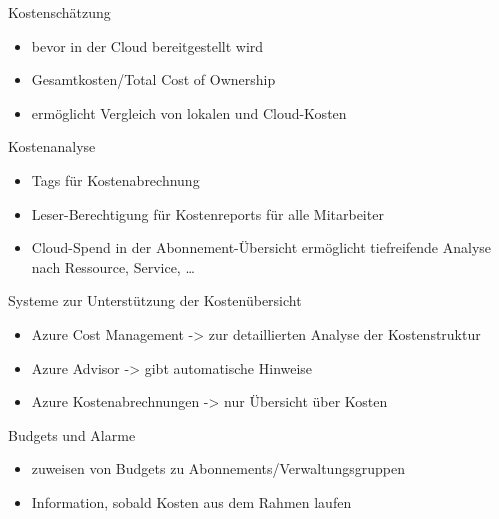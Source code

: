 

\begin{flashcard}[Definition]{Kostenschätzung}
  \begin{itemize}
    \item bevor in der Cloud bereitgestellt wird
    \item Gesamtkosten/Total Cost of Ownership
    \item ermöglicht Vergleich von lokalen und Cloud-Kosten
  \end{itemize}
\end{flashcard}

\begin{flashcard}[Definition]{Kostenanalyse}
  \begin{itemize}
    \item Tags für Kostenabrechnung
    \item Leser-Berechtigung für Kostenreports für alle Mitarbeiter
    \item Cloud-Spend in der Abonnement-Übersicht\newline
      ermöglicht tiefreifende Analyse nach Ressource, Service, \ldots
  \end{itemize}
\end{flashcard}

\begin{flashcard}[Definition]{Systeme zur Unterstützung der Kostenübersicht}
  \begin{itemize}
    \item Azure Cost Management -> zur detaillierten Analyse der Kostenstruktur
    \item Azure Advisor -> gibt automatische Hinweise
    \item Azure Kostenabrechnungen -> nur Übersicht über Kosten
  \end{itemize}
\end{flashcard}

\begin{flashcard}[Definition]{Budgets und Alarme}
  \begin{itemize}
    \item zuweisen von Budgets zu Abonnements/Verwaltungsgruppen
    \item Information, sobald Kosten aus dem Rahmen laufen
  \end{itemize}
\end{flashcard}

